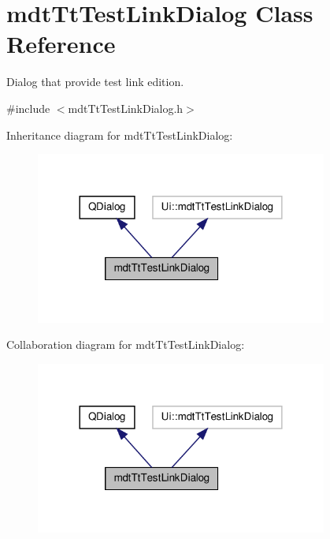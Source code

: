 \hypertarget{classmdt_tt_test_link_dialog}{\section{mdt\-Tt\-Test\-Link\-Dialog Class Reference}
\label{classmdt_tt_test_link_dialog}
}


Dialog that provide test link edition.  




{\ttfamily \#include $<$mdt\-Tt\-Test\-Link\-Dialog.\-h$>$}



Inheritance diagram for mdt\-Tt\-Test\-Link\-Dialog\-:\nopagebreak
\begin{figure}[H]
\begin{center}
\leavevmode
\includegraphics[width=272pt]{classmdt_tt_test_link_dialog__inherit__graph}
\end{center}
\end{figure}


Collaboration diagram for mdt\-Tt\-Test\-Link\-Dialog\-:\nopagebreak
\begin{figure}[H]
\begin{center}
\leavevmode
\includegraphics[width=272pt]{classmdt_tt_test_link_dialog__coll__graph}
\end{center}
\end{figure}
